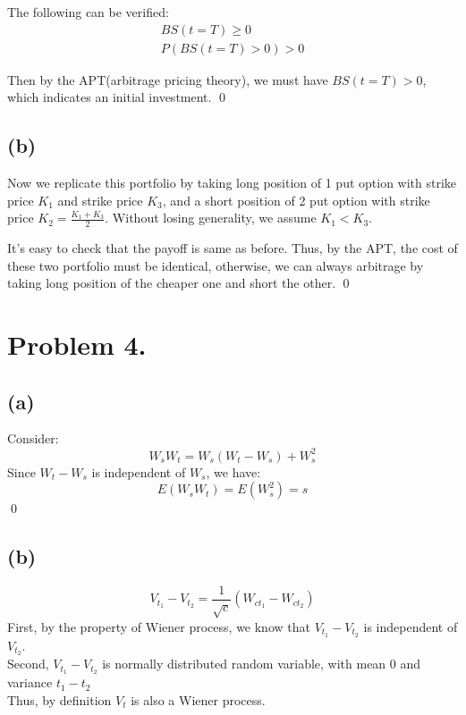 \documentclass{article}
\begin{document}
The following can be verified:
\begin{align} 
  BS(t=T)\geq 0\\
  P(BS(t=T)>0)>0
\end{align}

Then by the APT(arbitrage pricing theory), we must have $BS(t=T)> 0$, which indicates an initial investment. \qed

\subsection{(b)}
Now we replicate this portfolio by taking long position of 1 put option with strike price $K_1$ and strike price $K_3$, and a short position of 2 put option with strike price $K_2 = \frac{K_1+K_3}{2}$. Without losing generality, we assume $K_1<K_3$.

It's easy to check that the payoff is same as before. Thus, by the APT, the cost of these two portfolio must be identical, otherwise, we can always arbitrage by taking long position of the cheaper one and short the other. \qed

\section{Problem 4.}
\subsection{(a)}
Consider:
\begin{equation}
  W_s W_t = W_s(W_t - W_s) + W_s^2
\end{equation}
Since $W_t - W_s$ is independent of $W_s$, we have:
\begin{equation}
  E(W_sW_t) = E(W_s^2) = s
\end{equation}
\qed

\subsection{(b)}
\begin{equation}
  V_{t_1} - V_{t_2} = \frac{1}{\sqrt{c}}(W_{ct_1} - W_{ct_2})
\end{equation}
First, by the property of Wiener process, we know that $V_{t_1} - V_{t_2} $ is independent of $V_{t_2} $.\\
Second, $V_{t_1} - V_{t_2} $ is normally distributed random variable, with mean $0$ and variance $t_1 - t_2$\\
Thus, by definition $V_t$ is also a Wiener process.
\end{document}
